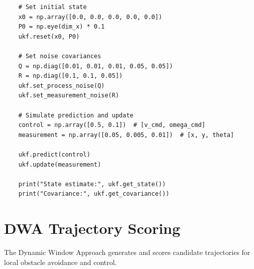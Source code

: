 \begin{lstlisting}
    # Set initial state
    x0 = np.array([0.0, 0.0, 0.0, 0.0, 0.0])
    P0 = np.eye(dim_x) * 0.1
    ukf.reset(x0, P0)
    
    # Set noise covariances
    Q = np.diag([0.01, 0.01, 0.01, 0.05, 0.05])
    R = np.diag([0.1, 0.1, 0.05])
    ukf.set_process_noise(Q)
    ukf.set_measurement_noise(R)
    
    # Simulate prediction and update
    control = np.array([0.5, 0.1])  # [v_cmd, omega_cmd]
    measurement = np.array([0.05, 0.005, 0.01])  # [x, y, theta]
    
    ukf.predict(control)
    ukf.update(measurement)
    
    print("State estimate:", ukf.get_state())
    print("Covariance:", ukf.get_covariance())
\end{lstlisting}

\section{DWA Trajectory Scoring}
\label{sec:dwa_scoring}

The Dynamic Window Approach generates and scores candidate trajectories for local obstacle avoidance and control.


